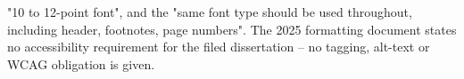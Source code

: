 %
%


%


	{"10 to 12-point font", and the "same font type should be used throughout,
	 including header, footnotes, page numbers".}
	{The 2025 formatting document states no accessibility requirement for the
	 filed dissertation -- no tagging, alt-text or WCAG obligation is given.}
